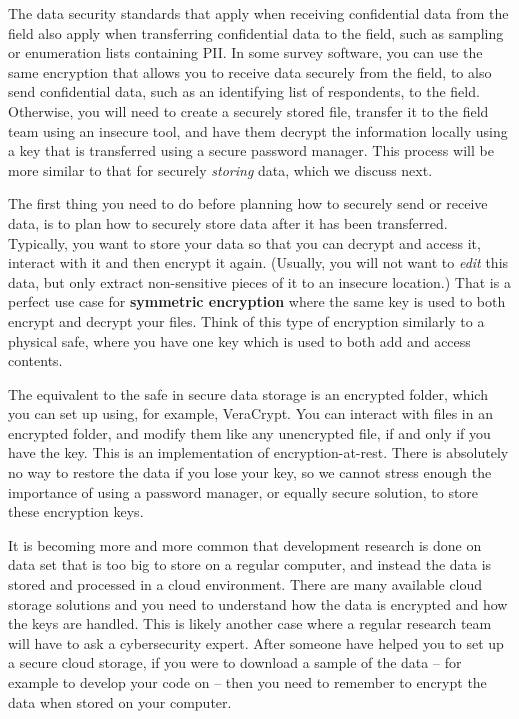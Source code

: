 The data security standards that apply
when receiving confidential data from the field
also apply when transferring confidential data to the field,
such as sampling or enumeration lists containing PII.
In some survey software,
you can use the same encryption that allows you to receive data securely
from the field, to also send confidential data,
such as an identifying list of respondents, to the field.
Otherwise, you will need to create a securely stored file,
transfer it to the field team using an insecure tool,
and have them decrypt the information locally
using a key that is transferred using a secure password manager.
This process will be more similar to that for securely \textit{storing} data,
which we discuss next.

The first thing you need to do before planning how to securely send or receive data,
is to plan how to securely store data after it has been transferred.
Typically, you want to store your data so that you can decrypt and access it,
interact with it and then encrypt it again.
(Usually, you will not want to \textit{edit} this data,
but only extract non-sensitive pieces of it to an insecure location.)
That is a perfect use case for \textbf{symmetric encryption}
where the same key is used to both encrypt and decrypt your files.
Think of this type of encryption similarly to a physical safe,
where you have one key which is used to both add and access contents.

The equivalent to the safe in secure data storage is an encrypted folder,
which you can set up using, for example, VeraCrypt.
You can interact with files in an encrypted folder,
and modify them like any unencrypted file,
if and only if you have the key.
This is an implementation of encryption-at-rest.
There is absolutely no way to restore the data if you lose your key,
so we cannot stress enough the importance of using a password manager,
or equally secure solution, to store these encryption keys.

It is becoming more and more common that development research
is done on data set that is too big to store on a regular computer,
and instead the data is stored and processed in a cloud environment.
There are many available cloud storage solutions
and you need to understand how the data is encrypted and how the keys are handled.
This is likely another case where a regular research team will have to ask a cybersecurity expert.
After someone have helped you to set up a secure cloud storage,
if you were to download a sample of the data --
for example to develop your code on --
then you need to remember to encrypt the data when stored on your computer.

